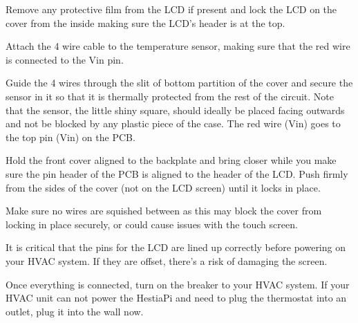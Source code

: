 Remove any protective film from the LCD if present and lock the LCD on the
cover from the inside making sure the LCD's header is at the top.

Attach the 4 wire cable to the temperature sensor, making sure that the red
wire is connected to the Vin pin.

Guide the 4 wires through the slit of bottom partition of the cover and secure
the sensor in it so that it is thermally protected from the rest of the
circuit. Note that the sensor, the little shiny square, should ideally be
placed facing outwards and not be blocked by any plastic piece of the case. The
red wire (Vin) goes to the top pin (Vin) on the PCB.

Hold the front cover aligned to the backplate and bring closer while you make
sure the pin header of the PCB is aligned to the header of the LCD. Push firmly
from the sides of the cover (not on the LCD screen) until it locks in place.

Make sure no wires are squished between as this may block the cover from
locking in place securely, or could cause issues with the touch screen.

It is critical that the pins for the LCD are lined up correctly before powering
on your HVAC system. If they are offset, there's a risk of damaging the screen.

Once everything is connected, turn on the breaker to your HVAC system. If your
HVAC unit can not power the HestiaPi and need to plug the thermostat into an
outlet, plug it into the wall now.
